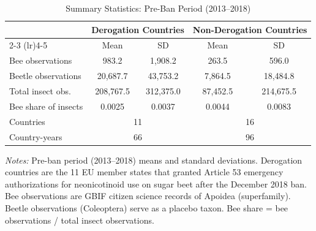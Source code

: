 \begin{table}[htbp]
\centering
\caption{Summary Statistics: Pre-Ban Period (2013--2018)}
\label{tab:summary}
\begin{threeparttable}
\begin{tabular}{lcccc}
\toprule
 & \multicolumn{2}{c}{Derogation Countries} & \multicolumn{2}{c}{Non-Derogation Countries} \\
\cmidrule(lr){2-3} \cmidrule(lr){4-5}
 & Mean & SD & Mean & SD \\
\midrule
Bee observations & 983.2 & 1,908.2 & 263.5 & 596.0 \\
Beetle observations & 20,687.7 & 43,753.2 & 7,864.5 & 18,484.8 \\
Total insect obs. & 208,767.5 & 312,375.0 & 87,452.5 & 214,675.5 \\
Bee share of insects & 0.0025 & 0.0037 & 0.0044 & 0.0083 \\
\midrule
Countries & \multicolumn{2}{c}{11} & \multicolumn{2}{c}{16} \\
Country-years & \multicolumn{2}{c}{66} & \multicolumn{2}{c}{96} \\
\bottomrule
\end{tabular}
\begin{tablenotes}[flushleft]
\small
\item \textit{Notes:} Pre-ban period (2013--2018) means and standard deviations. Derogation countries are the 11 EU member states that granted Article 53 emergency authorizations for neonicotinoid use on sugar beet after the December 2018 ban. Bee observations are GBIF citizen science records of Apoidea (superfamily). Beetle observations (Coleoptera) serve as a placebo taxon. Bee share = bee observations / total insect observations.
\end{tablenotes}
\end{threeparttable}
\end{table}

